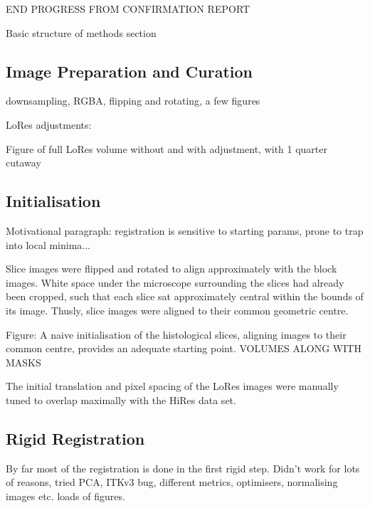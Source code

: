 END PROGRESS FROM CONFIRMATION REPORT 



\label{sec:methods}
  Basic structure of methods section
  
  \subsection{Image Preparation and Curation} %
  \label{sub:image_preparation_and_curation}
    downsampling, RGBA, flipping and rotating, a few figures
    
    LoRes adjustments:
    
    Figure of full LoRes volume without and with adjustment, with 1 quarter cutaway
    
  
  \subsection{Initialisation} %
  \label{sub:initialisation}
    Motivational paragraph: registration is sensitive to starting params, prone to trap into local minima...
      
    Slice images were flipped and rotated to align approximately with the block images. White space under the microscope surrounding the slices had already been cropped, such that each slice sat approximately central within the bounds of its image. Thusly, slice images were aligned to their common geometric centre.
    
    Figure: A naive initialisation of the histological slices, aligning images to their common centre, provides an adequate starting point. VOLUMES ALONG WITH MASKS
    
    The initial translation and pixel spacing of the LoRes images were manually tuned to overlap maximally with the HiRes data set.
    
    
    
  
  \subsection{Rigid Registration} %
  \label{sub:rigid_registration}
    By far most of the registration is done in the first rigid step. Didn't work for lots of reasons, tried PCA, ITKv3 bug, different metrics, optimisers, normalising images etc. loads of figures.
  
